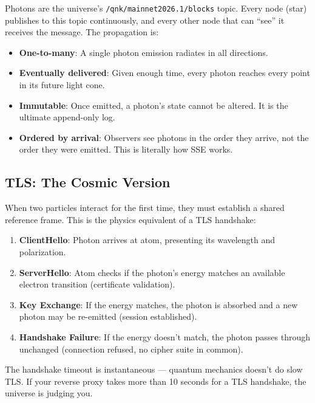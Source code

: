 \documentclass[12pt,a4paper]{article}
\begin{document}
Photons are the universe's \texttt{/qnk/mainnet2026.1/blocks} topic. Every
node (star) publishes to this topic continuously, and every other node that
can ``see'' it receives the message. The propagation is:

\begin{itemize}
    \item \textbf{One-to-many}: A single photon emission radiates in all directions.
    \item \textbf{Eventually delivered}: Given enough time, every photon reaches
    every point in its future light cone.
    \item \textbf{Immutable}: Once emitted, a photon's state cannot be altered.
    It is the ultimate append-only log.
    \item \textbf{Ordered by arrival}: Observers see photons in the order they
    arrive, not the order they were emitted. This is literally how SSE works.
\end{itemize}

\subsection{TLS: The Cosmic Version}

When two particles interact for the first time, they must establish a shared
reference frame. This is the physics equivalent of a TLS handshake:

\begin{enumerate}
    \item \textbf{ClientHello}: Photon arrives at atom, presenting its wavelength
    and polarization.
    \item \textbf{ServerHello}: Atom checks if the photon's energy matches an
    available electron transition (certificate validation).
    \item \textbf{Key Exchange}: If the energy matches, the photon is absorbed
    and a new photon may be re-emitted (session established).
    \item \textbf{Handshake Failure}: If the energy doesn't match, the photon
    passes through unchanged (connection refused, no cipher suite in common).
\end{enumerate}

The handshake timeout is instantaneous --- quantum mechanics doesn't do slow
TLS. If your reverse proxy takes more than 10 seconds for a TLS handshake,
the universe is judging you.

\end{document}
